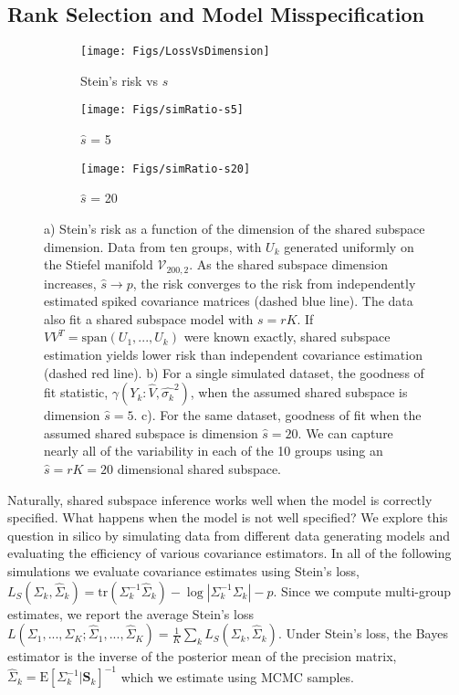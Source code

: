 \documentclass[12pt]{article}
\newcommand{\bl}[1]{{\mathbf #1}}
\newcommand{\Exp}[1]{{\text{E}}[ \ensuremath{ #1 } ]  }
\begin{document}
\subsection{Rank Selection and Model Misspecification}

\begin{figure}[t]
    \centering
    \begin{subfigure}[b]{0.3\textwidth}
        \texttt{[image: Figs/LossVsDimension]}
        \caption{Stein's risk vs $\hat{s}$}
        \label{fig:sdimension}
    \end{subfigure}
    \begin{subfigure}[b]{0.3\textwidth}
        \texttt{[image: Figs/simRatio-s5]}
        \caption{$\hat{s}$ = 5}
        \label{fig:ratio-s5}
    \end{subfigure}
    \begin{subfigure}[b]{0.3\textwidth}
        \texttt{[image: Figs/simRatio-s20]}
        \caption{$\hat{s}$ = 20}
        \label{fig:ratio-s20}
    \end{subfigure}
    \caption{a) Stein's risk as a function of the dimension of the
      shared subspace dimension.  Data from ten groups, with $U_k$
      generated uniformly on the Stiefel manifold
      $\mathcal{V}_{200, 2}$.  As the shared subspace dimension
      increases, $\hat{s} \rightarrow p$, the risk converges to the
      risk from independently estimated spiked covariance matrices
      (dashed blue line).  The data also fit a shared subspace model
      with $s=rK$.  If $VV^T = \text{span}(U_1, ..., U_k)$ were known
      exactly, shared subspace estimation yields lower risk than
      independent covariance estimation (dashed red line).  b) For a
      single simulated dataset, the goodness of fit statistic,
      $\gamma(Y_k: \hat{V}, \hat{\sigma_k}^2)$, when the assumed
      shared subspace is dimension $\hat{s} = 5$.  c).  For the same
      dataset, goodness of fit when the assumed shared subspace is
      dimension $\hat{s} = 20$.  We can capture nearly all of the
      variability in each of the 10 groups using an $\hat{s}=rK=20$
      dimensional shared subspace. }
\label{fig:dimensionPlots}
\end{figure}

Naturally, shared subspace inference works well when the model is
correctly specified.  What happens when the model is not well
specified?  We explore this question in silico by simulating data from
different data generating models and evaluating the efficiency of
various covariance estimators.  In all of the following simulations we
evaluate covariance estimates using Stein's loss,
$L_S( \Sigma_k , \hat\Sigma_k) = \text{tr}( \Sigma_k^{-1} \hat
\Sigma_k ) - \log |\Sigma_k^{-1} \Sigma_k | - p$.
Since we compute multi-group estimates, we report the
average Stein's loss
$L(\Sigma_1, ..., \Sigma_K; \hat\Sigma_1, ..., \hat\Sigma_K ) =
\frac{1}{K} \sum_k L_S( \Sigma_k , \hat\Sigma_k)$.
Under Stein's loss, the Bayes estimator is the inverse of
the posterior mean of the precision matrix,
$\hat \Sigma_{k} = \Exp{ \Sigma_k^{-1} | \bl S_k}^{-1}$ which we
estimate using MCMC samples.
\end{document}

